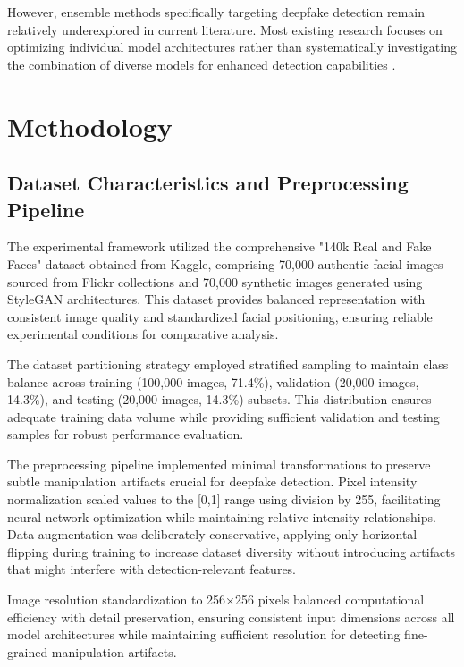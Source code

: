 \documentclass[conference]{IEEEtran}
\begin{document}
However, ensemble methods specifically targeting deepfake detection remain relatively underexplored in current literature. Most existing research focuses on optimizing individual model architectures rather than systematically investigating the combination of diverse models for enhanced detection capabilities \cite{dagar2022deepfake}.

\section{Methodology}

\subsection{Dataset Characteristics and Preprocessing Pipeline}

The experimental framework utilized the comprehensive "140k Real and Fake Faces" dataset obtained from Kaggle, comprising 70,000 authentic facial images sourced from Flickr collections and 70,000 synthetic images generated using StyleGAN architectures. This dataset provides balanced representation with consistent image quality and standardized facial positioning, ensuring reliable experimental conditions for comparative analysis.

The dataset partitioning strategy employed stratified sampling to maintain class balance across training (100,000 images, 71.4\%), validation (20,000 images, 14.3\%), and testing (20,000 images, 14.3\%) subsets. This distribution ensures adequate training data volume while providing sufficient validation and testing samples for robust performance evaluation.

The preprocessing pipeline implemented minimal transformations to preserve subtle manipulation artifacts crucial for deepfake detection. Pixel intensity normalization scaled values to the [0,1] range using division by 255, facilitating neural network optimization while maintaining relative intensity relationships. Data augmentation was deliberately conservative, applying only horizontal flipping during training to increase dataset diversity without introducing artifacts that might interfere with detection-relevant features.

Image resolution standardization to 256×256 pixels balanced computational efficiency with detail preservation, ensuring consistent input dimensions across all model architectures while maintaining sufficient resolution for detecting fine-grained manipulation artifacts.
\end{document}
